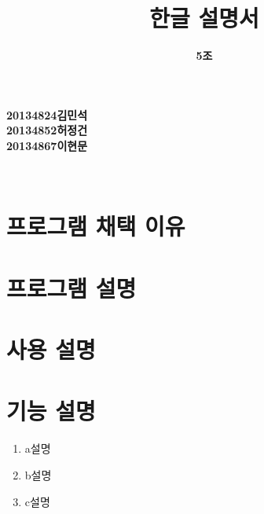 \documentclass[a4paper, 11pt]{article}
\title{\textbf{\Huge오목 한글 설명서}}
\author{\textbf{\LARGE5조}}
\begin{document}
   
   \maketitle
   
   \vspace{6cm}
\begin{center}
   \textbf{\large20134824김민석}\\
   \textbf{\large20134852허정건}\\
   \textbf{\large20134867이현문}\\
\end{center}
   
   
   
   
   \maketitle
   \newpage
   \thispagestyle{empty}        
   \mbox{}
   
   \begin{center} 
      \textbf{}\\
   \end{center}
   \vspace{1cm}
   \section{프로그램 채택 이유}
   \vspace{1cm}
   \section{프로그램 설명}
   \vspace{1cm}
   \section{사용 설명}
   \vspace{1cm}
   
   \section{기능 설명}
   \begin{enumerate}
      \item a설명
      \item b설명
      \item c설명

   
   \end{enumerate}

   
\end{document}
